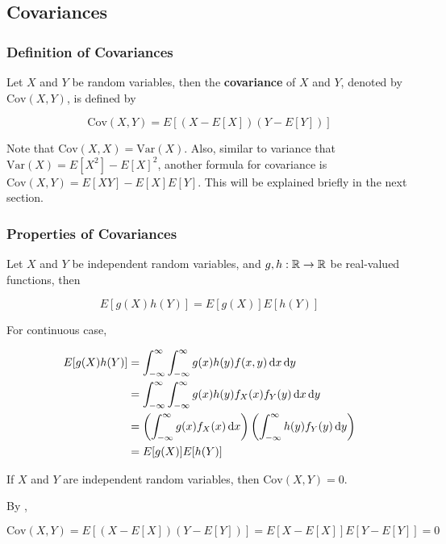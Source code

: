 \documentclass[a4paper,12pt]{article}
\begin{document}
\subsection{Covariances}
\subsubsection{Definition of Covariances}
\begin{dft}
  Let $X$ and $Y$ be random variables, then the \textbf{covariance} of $X$ and $Y$, denoted by $\mathrm{Cov}(X,Y)$, is defined by

  $$\mathrm{Cov}(X,Y)=E[(X-E[X])(Y-E[Y])]$$
\end{dft}\n

Note that $\mathrm{Cov}(X,X)=\mathrm{Var}(X)$. Also, similar to variance that $\mathrm{Var}(X)=E[X^{2}]-E[X]^{2}$, another formula for covariance is $\mathrm{Cov}(X,Y)=E[XY]-E[X]E[Y]$. This will be explained briefly in the next section.

\subsubsection{Properties of Covariances}
\begin{pst}
  Let $X$ and $Y$ be independent random variables, and $g,h:\mathbb{R}\to\mathbb{R}$ be real-valued functions, then

  $$E[g(X)h(Y)]=E[g(X)]E[h(Y)]$$\s

  \prf For continuous case,

  $$\begin{aligned}[t]
    E[g(X)h(Y)]&=\int_{-\infty}^{\infty}\int_{-\infty}^{\infty}g(x)h(y)f(x,y)\,\mathrm{d} x\,\mathrm{d} y\\
    &=\int_{-\infty}^{\infty}\int_{-\infty}^{\infty}g(x)h(y)f_{X}(x)f_{Y}(y)\,\mathrm{d} x\,\mathrm{d} y\\
    &=\left( \int_{-\infty}^{\infty}g(x)f_{X}(x)\,\mathrm{d} x\right)\left( \int_{-\infty}^{\infty}h(y)f_{Y}(y)\,\mathrm{d} y\right)\\
    &=E[g(X)]E[h(Y)]
  \end{aligned}$$
\end{pst}\n

\begin{crl}
  If $X$ and $Y$ are independent random variables, then $\mathrm{Cov}(X,Y)=0$.\n

  \prf By \rpst[\sctd{0}],

  $$\mathrm{Cov}(X,Y)=E[(X-E[X])(Y-E[Y])]=E[X-E[X]]E[Y-E[Y]]=0$$
\end{crl}\n
\end{document}
